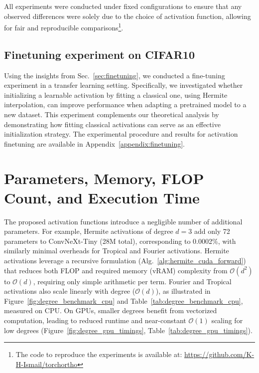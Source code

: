 \documentclass{article} %
\theoremstyle{plain}
\theoremstyle{definition}
\theoremstyle{remark}
\begin{document}
All experiments were conducted under fixed configurations to ensure that any observed differences were solely due to the choice of activation function, allowing for fair and reproducible comparisons\footnote{The code to reproduce the experiments is available at: \href{https://github.com/K-H-Ismail/torchortho}{https://github.com/K-H-Ismail/torchortho}}.
\subsection{Finetuning experiment on CIFAR10}
Using the insights from Sec.~\ref{sec:finetuning}, we conducted a fine-tuning experiment in a transfer learning setting. Specifically, we investigated whether initializing a learnable activation by fitting a classical one, using Hermite interpolation, can improve performance when adapting a pretrained model to a new dataset. This experiment complements our theoretical analysis by demonstrating how fitting classical activations can serve as an effective initialization strategy. The experimental procedure and results for activation finetuning are available in Appendix~\ref{appendix:finetuning}.

\section{Parameters, Memory, FLOP Count, and Execution Time}

The proposed activation functions introduce a negligible number of additional parameters. For example, Hermite activations of degree $d=3$ add only 72 parameters to ConvNeXt-Tiny (28M total), corresponding to 0.0002\%, with similarly minimal overheads for Tropical and Fourier activations. Hermite activations leverage a recursive formulation (Alg.~\ref{alg:hermite_cuda_forward}) that reduces both FLOP and required memory (vRAM) complexity from $\mathcal{O}(d^2)$ to $\mathcal{O}(d)$, requiring only simple arithmetic per term. Fourier and Tropical activations also scale linearly with degree ($\mathcal{O}(d)$), as illustrated in Figure~\ref{fig:degree_benchmark_cpu} and Table~\ref{tab:degree_benchmark_cpu}, measured on CPU. On GPUs, smaller degrees benefit from vectorized computation, leading to reduced runtime and near-constant $\mathcal{O}(1)$ scaling for low degrees (Figure~\ref{fig:degree_gpu_timings}, Table~\ref{tab:degree_gpu_timings}).
\end{document}
